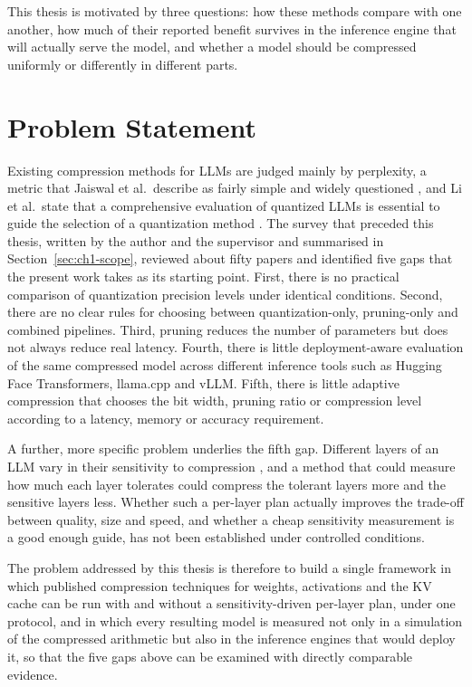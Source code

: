 \documentclass[
11pt, %
english, %
singlespacing, %
headsepline, %
]{MastersDoctoralThesis} %
\begin{document}
This thesis is motivated by three questions: how these methods compare with one another, how much of their reported benefit survives in the inference engine that will actually serve the model, and whether a model should be compressed uniformly or differently in different parts.

\section{Problem Statement}
\label{sec:ch1-problem}

Existing compression methods for LLMs are judged mainly by perplexity, a metric that Jaiswal et al.\ describe as fairly simple and widely questioned \cite{jaiswal2024compressing}, and Li et al.\ state that a comprehensive evaluation of quantized LLMs is essential to guide the selection of a quantization method \cite{li2024evaluating}. The survey that preceded this thesis, written by the author and the supervisor and summarised in Section~\ref{sec:ch1-scope}, reviewed about fifty papers and identified five gaps that the present work takes as its starting point. First, there is no practical comparison of quantization precision levels under identical conditions. Second, there are no clear rules for choosing between quantization-only, pruning-only and combined pipelines. Third, pruning reduces the number of parameters but does not always reduce real latency. Fourth, there is little deployment-aware evaluation of the same compressed model across different inference tools such as Hugging Face Transformers, llama.cpp and vLLM. Fifth, there is little adaptive compression that chooses the bit width, pruning ratio or compression level according to a latency, memory or accuracy requirement.

A further, more specific problem underlies the fifth gap. Different layers of an LLM vary in their sensitivity to compression \cite{yuan2025asvd}, and a method that could measure how much each layer tolerates could compress the tolerant layers more and the sensitive layers less. Whether such a per-layer plan actually improves the trade-off between quality, size and speed, and whether a cheap sensitivity measurement is a good enough guide, has not been established under controlled conditions.

The problem addressed by this thesis is therefore to build a single framework in which published compression techniques for weights, activations and the KV cache can be run with and without a sensitivity-driven per-layer plan, under one protocol, and in which every resulting model is measured not only in a simulation of the compressed arithmetic but also in the inference engines that would deploy it, so that the five gaps above can be examined with directly comparable evidence.
\end{document}
